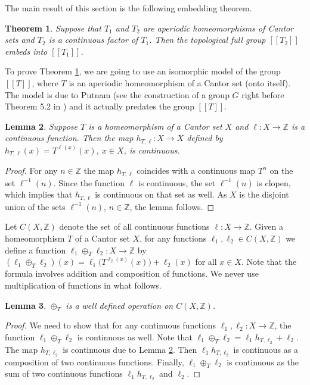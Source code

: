 \documentclass[12pt]{article}
\newtheorem{theorem}{Theorem}[section]
\newtheorem{lemma}[theorem]{Lemma}
\theoremstyle{definition}
\def\bZ{\mathbb{Z}}
\begin{document}
The main result of this section is the following embedding theorem.

\begin{theorem}\label{TFG-embeds}
Suppose that $T_1$ and $T_2$ are aperiodic homeomorphisms of Cantor sets 
and $T_2$ is a continuous factor of $T_1$.  Then the topological full group 
$[[T_2]]$ embeds into $[[T_1]]$.
\end{theorem}

To prove Theorem \ref{TFG-embeds}, we are going to use an isomorphic model 
of the group $[[T]]$, where $T$ is an aperiodic homeomorphism of a Cantor 
set (onto itself).  The model is due to Putnam \cite{Putnam89} (see the 
construction of a group $G$ right before Theorem 5.2 in \cite{Putnam89}) 
and it actually predates the group $[[T]]$.

\begin{lemma}\label{variable-power}
Suppose $T$ is a homeomorphism of a Cantor set $X$ and $\ell:X\to\bZ$ is a 
continuous function.  Then the map $h_{T,\ell}:X\to X$ defined by 
$h_{T,\ell}(x)=T^{\ell(x)}(x)$, $x\in X$, is continuous.
\end{lemma}

\begin{proof}
For any $n\in\bZ$ the map $h_{T,\ell}$ coincides with a continuous map 
$T^n$ on the set $\ell^{-1}(n)$.  Since the function $\ell$ is continuous, 
the set $\ell^{-1}(n)$ is clopen, which implies that $h_{T,\ell}$ is 
continuous on that set as well.  As $X$ is the disjoint union of the sets 
$\ell^{-1}(n)$, $n\in\bZ$, the lemma follows.
\end{proof}

Let $C(X,\bZ)$ denote the set of all continuous functions $\ell:X\to\bZ$.  
Given a homeomorphism $T$ of a Cantor set $X$, for any functions 
$\ell_1,\ell_2\in C(X,\bZ)$ we define a function 
$\ell_1\oplus_T\ell_2:X\to\bZ$ by $(\ell_1\oplus_T\ell_2)(x)= 
\ell_1\bigl(T^{\ell_2(x)}(x)\bigr)+\ell_2(x)$ for all $x\in X$.  Note that 
the formula involves addition and composition of functions.  We never use 
multiplication of functions in what follows.

\begin{lemma}
$\oplus_T$ is a well defined operation on $C(X,\bZ)$.
\end{lemma}

\begin{proof}
We need to show that for any continuous functions $\ell_1,\ell_2:X\to\bZ$, 
the function $\ell_1\oplus_T\ell_2$ is continuous as well.  Note that 
$\ell_1\oplus_T\ell_2=\ell_1h_{T,\ell_2}+\ell_2$.  The map $h_{T,\ell_2}$ 
is continuous due to Lemma \ref{variable-power}.  Then $\ell_1h_{T,\ell_2}$ 
is continuous as a composition of two continuous functions.  Finally, 
$\ell_1\oplus_T\ell_2$ is continuous as the sum of two continuous functions 
$\ell_1h_{T,\ell_2}$ and $\ell_2$.
\end{proof}
\end{document}
